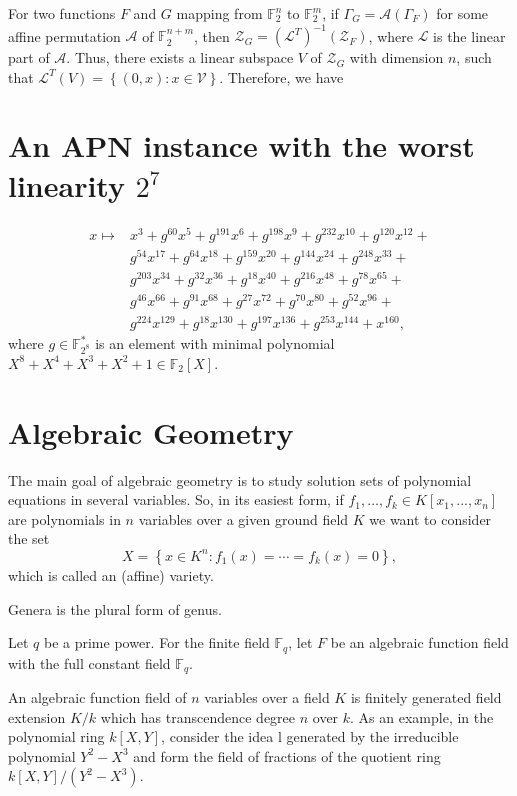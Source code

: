 \documentclass[8pt,oneside]{article}
\newcommand{\0}{\textbf{0}}
\newcommand{\1}{\textbf{1}}
\newcommand{\F}{\mathbb{F}}
\begin{document}
    For two functions $ F $ and $ G $ mapping from $ \F_2^n $ to $ \F_2^m $, 
    if $ \Gamma_G=\mathcal{A}(\Gamma_F) $ for some affine permutation $ \mathcal{A} $ of $ \F_2^{n+m} $, 
    then $ \mathcal{Z}_G=(\mathcal{L}^T)^{-1}(\mathcal{Z}_F) $, where $ \mathcal{L} $ is the linear part of $ \mathcal{A} $. 
    Thus, there exists a linear subspace $ V $ of $ \mathcal{Z}_G $ with dimension $ n $, 
    such that $ \mathcal{L}^T(V)=\left\{ (0,x):x\in\mathcal{V} \right\} $. 
    Therefore, we have 


\section{An APN instance with the worst linearity $ 2^7 $}
    \begin{align*}
        x \mapsto & x^3+g^{60} x^5+g^{191} x^6+g^{198} x^9+g^{232} x^{10}+g^{120} x^{12}+ \\
        & g^{54} x^{17}+g^{64} x^{18}+g^{159} x^{20}+g^{144} x^{24}+g^{248} x^{33}+\\
        & g^{203} x^{34}+g^{32} x^{36}+g^{18} x^{40}+g^{216} x^{48}+g^{78} x^{65}+ \\
        & g^{46} x^{66}+g^{91} x^{68}+g^{27} x^{72}+g^{70} x^{80}+g^{52} x^{96}+ \\
        & g^{224} x^{129}+g^{18} x^{130}+g^{197} x^{136}+g^{253} x^{144}+x^{160},
    \end{align*}
    where $ g\in\F_{2^8}^* $ is an element with minimal polynomial $ X^8+X^4+X^3+X^2+1\in\F_2[X] $.


\section{Algebraic Geometry} 
    The main goal of algebraic geometry is to study solution sets of polynomial equations in several variables. 
    So, in its easiest form, if $f_1,\dots, f_k \in K\left[ x_1,..., x_n \right] $ are polynomials in $ n $ variables over a given ground field $ K $ we want to consider the set 
    \[X=\left\{ x\in K^n:f_1(x)=\cdots=f_k(x)=0 \right\},\]
    which is called an (affine) variety.

    Genera is the plural form of genus.

    Let $ q $ be a prime power. For the finite field $ \F_q $, let $ F $ be an algebraic function field with the full constant field $ \F_q $.
    
    An algebraic function field of $ n $ variables over a field $ K $ is finitely generated field extension $ K/k $ which has transcendence degree $ n $ over $ k $. 
    As an example, in the polynomial ring $ k\left[ X,Y \right] $, consider the idea l generated by the irreducible polynomial $ Y^2-X^3 $ and form the field of fractions of the quotient ring $ k\left[ X,Y \right]/\left( Y^2-X^3 \right) $. 
\end{document}
